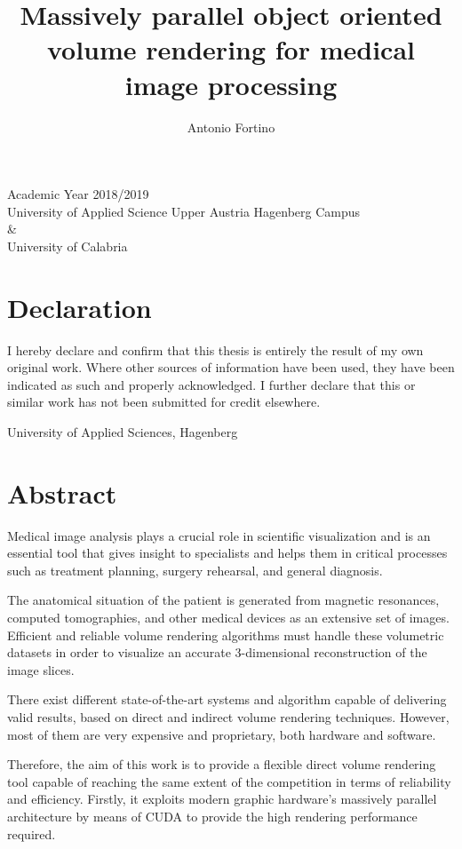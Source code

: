 \documentclass[12pt,a4paper]{extarticle}
\author{Antonio Fortino}
\title{Massively parallel object oriented volume rendering for medical image processing}
\begin{document}
\maketitle
\begin{center}
Academic Year 2018/2019\\
University of Applied Science Upper Austria Hagenberg Campus\\
\&\\
University of Calabria
\end{center}
\pagebreak
\fancyhf{}
\fancyhead[R]{\thepage}
\section*{Declaration}
\noindent
I hereby declare and confirm that this thesis is entirely the result of my own original work. 
Where other sources of information have been used, they have been indicated as such and properly 
acknowledged. I further declare that this or similar work has not been submitted for credit elsewhere.
\vspace{10mm}

\noindent
University of Applied Sciences, Hagenberg 
\vspace{12mm}

\noindent
\theauthor
\pagebreak
\section*{Abstract}
Medical image analysis plays a crucial role in scientific visualization and is an essential tool that gives insight to specialists and helps them in critical processes such as treatment planning, surgery rehearsal, and general diagnosis.

The anatomical situation of the patient is generated from magnetic resonances, computed tomographies, and other medical devices as an extensive set of images. Efficient and reliable volume rendering algorithms must handle these volumetric datasets in order to visualize an accurate 3-dimensional reconstruction of the image slices.

There exist different state-of-the-art systems and algorithm capable of delivering valid results,  based on direct and indirect volume rendering techniques. However, most of them are very expensive and proprietary, both hardware and software.

Therefore, the aim of this work is to provide a flexible direct volume rendering tool capable of reaching the same extent of the competition in terms of reliability and efficiency.
Firstly, it exploits modern graphic hardware's massively parallel architecture by means of CUDA to provide the high rendering performance required.  
\end{document}
